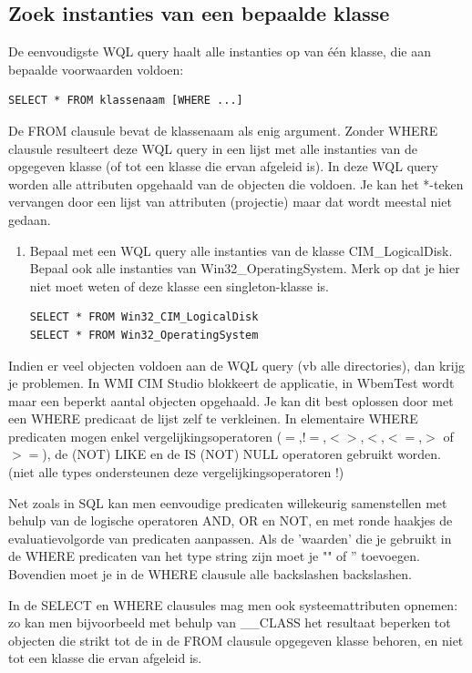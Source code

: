 \documentclass[11pt,a4paper]{report}
\begin{document}
\subsection{Zoek instanties van een bepaalde klasse}
De eenvoudigste WQL query haalt alle instanties op van één klasse, die aan bepaalde voorwaarden voldoen:
\begin{lstlisting}
SELECT * FROM klassenaam [WHERE ...]
\end{lstlisting}
De FROM clausule bevat de klassenaam als enig argument. Zonder WHERE clausule resulteert deze WQL query in een lijst met alle instanties van de opgegeven klasse (of tot een klasse die ervan afgeleid is). In deze WQL query worden alle attributen opgehaald van de objecten die voldoen. Je kan het *-teken vervangen door een lijst van attributen (projectie) maar dat wordt meestal niet gedaan.
\begin{enumerate}[resume]
	\item Bepaal met een WQL query alle instanties van de klasse CIM\_LogicalDisk.
	Bepaal ook alle instanties van Win32\_OperatingSystem. Merk op dat je hier niet moet weten of deze klasse een singleton-klasse is.
	\begin{lstlisting}
SELECT * FROM Win32_CIM_LogicalDisk 
SELECT * FROM Win32_OperatingSystem 
	\end{lstlisting}
\end{enumerate}
Indien er veel objecten voldoen aan de WQL query (vb alle directories), dan krijg je problemen. In WMI CIM Studio blokkeert de applicatie, in WbemTest wordt maar een beperkt aantal objecten opgehaald. Je kan dit best oplossen door met een WHERE predicaat de lijst zelf te verkleinen.
In elementaire WHERE predicaten mogen enkel vergelijkingsoperatoren ($=$,$!=$,$<>$,$<$,$<=$,$>$ of $>=$), de (NOT) LIKE en de IS (NOT) NULL operatoren gebruikt worden. (niet alle types ondersteunen deze vergelijkingsoperatoren !)
\par Net zoals in SQL kan men eenvoudige predicaten willekeurig samenstellen met behulp van de logische operatoren AND, OR en NOT, en met ronde haakjes de evaluatievolgorde van predicaten aanpassen. Als de 'waarden' die je gebruikt in de WHERE predicaten van het type string zijn moet je "" of '' toevoegen. Bovendien moet je in de WHERE clausule alle backslashen backslashen.
\par In de SELECT en WHERE clausules mag men ook systeemattributen opnemen: zo kan men bijvoorbeeld met behulp van \_\_CLASS het resultaat beperken tot objecten die strikt tot de in de FROM clausule opgegeven klasse behoren, en niet tot een klasse die ervan afgeleid is.
\end{document}
